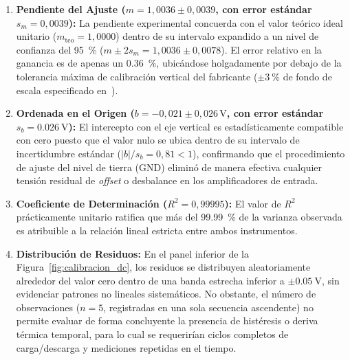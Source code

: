 \begin{enumerate}
    \item \textbf{Pendiente del Ajuste ($m = 1{,}0036 \pm 0{,}0039$, con error estándar $s_m = 0{,}0039$):}
    La pendiente experimental concuerda con el valor teórico ideal unitario ($m_{\text{teo}} = 1{,}0000$) dentro de su intervalo expandido a un nivel de confianza del \qty{95}{\percent} ($m \pm 2 s_m = 1{,}0036 \pm 0{,}0078$). El error relativo en la ganancia es de apenas un \qty{0,36}{\percent}, ubicándose holgadamente por debajo de la tolerancia máxima de calibración vertical del fabricante ($\pm\qty{3}{\percent}$ de fondo de escala especificado en~\cite{rs_rtc1000_specs}).
    
    \item \textbf{Ordenada en el Origen ($b = -0{,}021 \pm 0{,}026\,\unit{\volt}$, con error estándar $s_b = \qty{0,026}{\volt}$):}
    El intercepto con el eje vertical es estadísticamente compatible con cero puesto que el valor nulo se ubica dentro de su intervalo de incertidumbre estándar ($|b|/s_b = 0{,}81 < 1$), confirmando que el procedimiento de ajuste del nivel de tierra ($\text{GND}$) eliminó de manera efectiva cualquier tensión residual de \textit{offset} o desbalance en los amplificadores de entrada.

    \item \textbf{Coeficiente de Determinación ($R^2 = 0{,}99995$):}
    El valor de $R^2$ prácticamente unitario ratifica que más del \qty{99,99}{\percent} de la varianza observada es atribuible a la relación lineal estricta entre ambos instrumentos.

    \item \textbf{Distribución de Residuos:}
    En el panel inferior de la Figura~\ref{fig:calibracion_dc}, los residuos se distribuyen aleatoriamente alrededor del valor cero dentro de una banda estrecha inferior a $\pm\qty{0,05}{\volt}$, sin evidenciar patrones no lineales sistemáticos. No obstante, el número de observaciones ($n = 5$, registradas en una sola secuencia ascendente) no permite evaluar de forma concluyente la presencia de histéresis o deriva térmica temporal, para lo cual se requerirían ciclos completos de carga/descarga y mediciones repetidas en el tiempo.
\end{enumerate}

